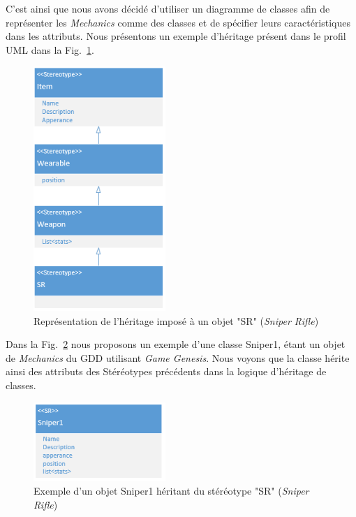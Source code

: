 C'est ainsi que nous avons décidé d'utiliser un diagramme de classes afin de représenter les \emph{Mechanics} comme des classes et de spécifier leurs caractéristiques dans les attributs.
Nous présentons un exemple d'héritage présent dans le profil UML dans la Fig.~\ref{fig.herit}.

\begin{figure}[H]
    \centering
    \includegraphics[width=5cm]{10_img/chap5/heritage.PNG} 
    \caption{Représentation de l'héritage imposé à un objet "SR" (\emph{Sniper Rifle})}
    \label{fig.herit}
\end{figure}

Dans la Fig.~\ref{fig.sniper} nous proposons un exemple d'une classe Sniper1, étant un objet de \emph{Mechanics} du GDD utilisant \emph{Game Genesis}.
Nous voyons que la classe hérite ainsi des attributs des Stéréotypes précédents dans la logique d'héritage de classes.
\begin{figure}[H]
    \centering
    \includegraphics[width=5cm]{10_img/chap5/sniper.PNG} 
    \caption{Exemple d'un objet Sniper1 héritant du stéréotype "SR" (\emph{Sniper Rifle})}
    \label{fig.sniper}
\end{figure}



